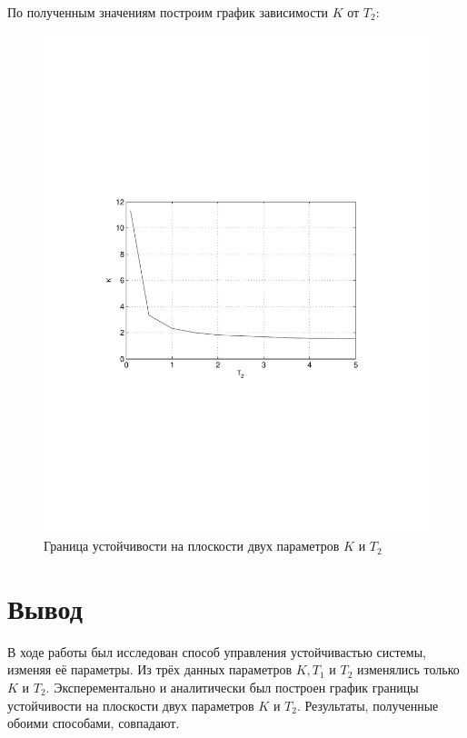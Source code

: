 \documentclass[a4paper, 11pt, russian]{article}
\begin{document}
    По полученным значениям построим график зависимости $K$ от $T_2$:
    \begin{figure}[ht!]
        \centering
        \includegraphics[width = \textwidth]{KT2graph}
        \caption{Граница устойчивости на плоскости двух параметров $K$ и $T_2$}
    \end{figure}
    \clearpage
    \section{Вывод}
    В ходе работы был исследован способ управления устойчивастью системы, изменяя её параметры. Из трёх данных параметров $K, T_1$ и $T_2$ изменялись только $K$ и $T_2$. Эксперементально и аналитически был построен график границы устойчивости на плоскости двух параметров $K$ и $T_2$. Результаты, полученные обоими способами, совпадают.
\end{document}

